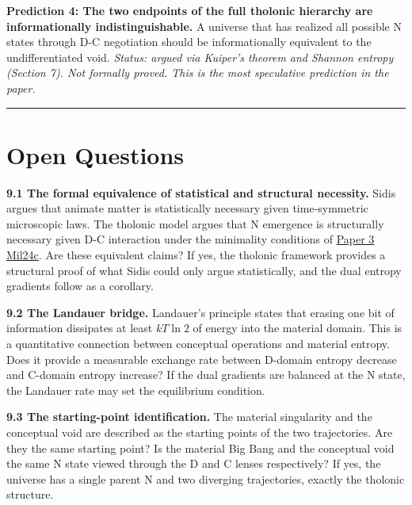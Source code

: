 \documentclass[12pt]{article}
\begin{document}
\textbf{Prediction 4: The two endpoints of the full tholonic hierarchy
are informationally indistinguishable.} A universe that has realized all
possible N states through D-C negotiation should be informationally
equivalent to the undifferentiated void. \emph{Status: argued via
Kuiper's theorem and Shannon entropy (Section 7). Not formally proved.
This is the most speculative prediction in the paper.}

\begin{center}\rule{0.5\linewidth}{0.5pt}\end{center}

\section{Open Questions}\label{open-questions}

\textbf{9.1 The formal equivalence of statistical and structural
necessity.} Sidis argues that animate matter is statistically necessary
given time-symmetric microscopic laws. The tholonic model argues that N
emergence is structurally necessary given D-C interaction under the
minimality conditions of
\href{https://github.com/baardev/truevalue/blob/main/docnav/Research/papers/3_minimal-recursive-triadic-framework/3_minimal-recursive-triadic-framework.pdf}{Paper
3}
\href{https://github.com/baardev/truevalue/blob/main/docnav/Research/papers/3_minimal-recursive-triadic-framework/3_minimal-recursive-triadic-framework.pdf}{Mil24c}.
Are these equivalent claims? If yes, the tholonic framework provides a
structural proof of what Sidis could only argue statistically, and the
dual entropy gradients follow as a corollary.

\textbf{9.2 The Landauer bridge.} Landauer's principle states that
erasing one bit of information dissipates at least \(kT \ln 2\) of
energy into the material domain. This is a quantitative connection
between conceptual operations and material entropy. Does it provide a
measurable exchange rate between D-domain entropy decrease and C-domain
entropy increase? If the dual gradients are balanced at the N state, the
Landauer rate may set the equilibrium condition.

\textbf{9.3 The starting-point identification.} The material singularity
and the conceptual void are described as the starting points of the two
trajectories. Are they the same starting point? Is the material Big Bang
and the conceptual void the same N state viewed through the D and C
lenses respectively? If yes, the universe has a single parent N and two
diverging trajectories, exactly the tholonic structure.
\end{document}
